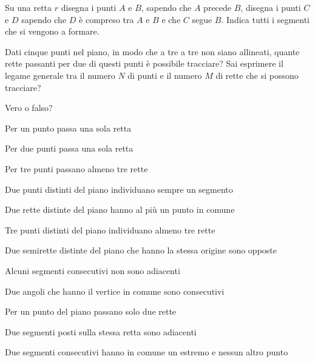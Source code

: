 \begin{esercizio}
\label{ese:1.47}
Su una retta $r$ disegna i punti $A$ e $B$, sapendo che $A$ precede 
$B$, disegna i punti $C$ e $D$ sapendo che $D$ è compreso tra $A$ e 
$B$ e che $C$ segue $B$. Indica tutti i segmenti che si vengono a 
formare.
\end{esercizio}

\begin{esercizio}
\label{ese:1.48}
Dati cinque punti nel piano, in modo che a tre a tre non siano 
allineati, quante rette passanti per due di questi punti è possibile 
tracciare? Sai esprimere il legame generale tra il numero $N$ di 
punti e il numero $M$ di rette che si possono tracciare?
\end{esercizio}

\begin{esercizio}
\label{ese:1.49}
Vero o falso?
\begin{enumeratea}
\item Per un punto passa una sola retta		\hfill\boxV\quad\boxF
\item Per due punti passa una sola retta		
\hfill\boxV\quad\boxF
\item Per tre punti passano almeno tre rette	\hfill\boxV\quad\boxF
\item Due punti distinti del piano individuano sempre un 
segmento	\hfill\boxV\quad\boxF
\item Due rette distinte del piano hanno al più un punto in 
comune	\hfill\boxV\quad\boxF
\item Tre punti distinti del piano individuano almeno tre rette	
\hfill\boxV\quad\boxF
\item Due semirette distinte del piano che hanno la stessa origine 
sono opposte	\hfill\boxV\quad\boxF
\item Alcuni segmenti consecutivi non sono adiacenti		
\hfill\boxV\quad\boxF
\item Due angoli che hanno il vertice in comune sono 
consecutivi		\hfill\boxV\quad\boxF
\item Per un punto del piano passano solo due rette		
\hfill\boxV\quad\boxF
\item Due segmenti posti sulla stessa retta sono adiacenti	
\hfill\boxV\quad\boxF
\item Due segmenti consecutivi hanno in comune un estremo e nessun 
altro punto		\hfill\boxV\quad\boxF
\end{enumeratea}
\end{esercizio}

